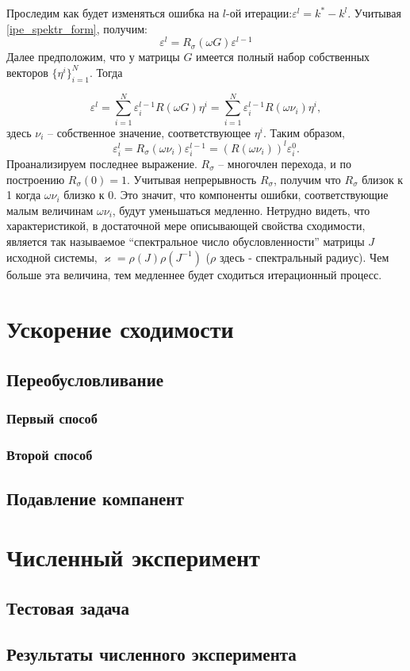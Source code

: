 \documentclass[a4paper,12pt]{report}
\begin{document}
Проследим как будет изменяться ошибка на $l$-ой итерации:$\varepsilon^l= k^* - k^l$. Учитывая \eqref{ipe_spektr_form}, получим:
	$$\varepsilon^l = R_\sigma (\omega G)\varepsilon^{l-1}$$
Далее предположим, что у матрицы $G$ имеется полный набор собственных векторов $\{\eta^i\}_{i=1}^N$. Тогда

	$$ \varepsilon^l = \sum_{i = 1}^{N}\varepsilon_i^{l-1}R(\omega G) \eta^i = 		\sum_{i=1}^{N}\varepsilon_i^{l-1}R(\omega \nu_i )\eta^i,$$
здесь $\nu_i$ -- собственное значение, соответствующее $\eta^i$. Таким образом,%
	$$ \varepsilon_i^l = R_\sigma(\omega \nu_i) \varepsilon_i^{l-1} = (R(\omega \nu_i))^l\varepsilon_i^0.$$
Проанализируем последнее выражение. $R_\sigma$ -- многочлен перехода, и по построению $R_\sigma(0) = 1$. Учитывая непрерывность $R_\sigma$, получим что $R_\sigma$ близок к 1 когда $\omega \nu_i$ близко к 0. Это значит, что компоненты ошибки, соответствующие малым величинам $\omega \nu_i$, будут уменьшаться медленно. Нетрудно видеть, что характеристикой,  в достаточной мере описывающей свойства сходимости, является так называемое ``спектральное число обусловленности'' матрицы $J$ исходной системы, $\varkappa = \rho(J) \rho(J^{-1})$ ($\rho$ здесь - спектральный радиус). Чем больше эта величина, тем медленнее будет сходиться итерационный процесс.
  
  \chapter{Ускорение сходимости}
  \label{c:converg_accel}
  
  \section{Переобусловливание}
  \label{s:precond}
    
  \subsection{Первый способ}
  \label{ss:precond_1}
  
  \subsection{Второй способ}
  \label{ss:precond_2}
  
  \section{Подавление компанент}
  \label{s:opress}
  
  \chapter{Численный эксперимент}
  \label{c:numer_ex}
  
  \section{Тестовая задача}
  \label{s:test_problem}
  
  \section{Результаты численного эксперимента}
  \label{s:results}
  
  

  \appendix
\end{document}
